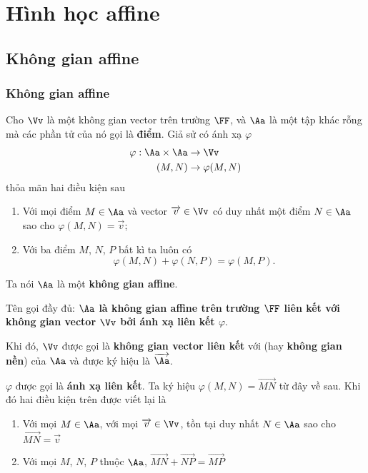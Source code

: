 \chapter{Hình học affine}

\section{Không gian affine}

\subsection*{Không gian affine}

\begin{definition}
	Cho $\Vv$ là một không gian vector trên trường $\FF$, và $\Aa$ là một tập khác rỗng mà các phần tử của nó gọi là \textbf{điểm}. Giả sử có ánh xạ $\varphi$
	\begin{align*}
		\varphi: \Aa \times \Aa & \to \Vv \\ (M, N) & \to \varphi(M, N)
	\end{align*} 
	thỏa mãn hai điều kiện sau
	\begin{enumerate}
		\item Với mọi điểm $M \in \Aa$ và vector $\overrightarrow{v} \in \Vv$ có duy nhất một điểm $N \in \Aa$ sao cho $\varphi(M, N) = \overrightarrow{v}$;
		\item Với ba điểm $M$, $N$, $P$ bất kì ta luôn có \[\varphi(M,N) + \varphi(N,P) = \varphi(M,P). \]
	\end{enumerate}
	
	Ta nói $\Aa$ là một \textbf{không gian affine}.
    
    Tên gọi đầy đủ: \textbf{$\Aa$ là không gian affine trên trường $\FF$ liên kết với không gian vector $\Vv$ bởi ánh xạ liên kết $\varphi$}.
\end{definition}

Khi đó, $\Vv$ được gọi là \textbf{không gian vector liên kết} với (hay \textbf{không gian nền}) của $\Aa$ và được ký hiệu là $\overrightarrow{\Aa}$.

$\varphi$ được gọi là \textbf{ánh xạ liên kết}. Ta ký hiệu $\varphi(M, N) = \overrightarrow{MN}$ từ đây về sau. Khi đó hai điều kiện trên được viết lại là

\begin{enumerate}
	\item Với mọi $M \in \Aa$, với mọi $\overrightarrow{v} \in \Vv$, tồn tại duy nhất $N \in \Aa$ sao cho $\overrightarrow{MN} = \overrightarrow{v}$
	\item Với mọi $M$, $N$, $P$ thuộc $\Aa$, $\overrightarrow{MN} + \overrightarrow{NP} = \overrightarrow{MP}$
\end{enumerate}

